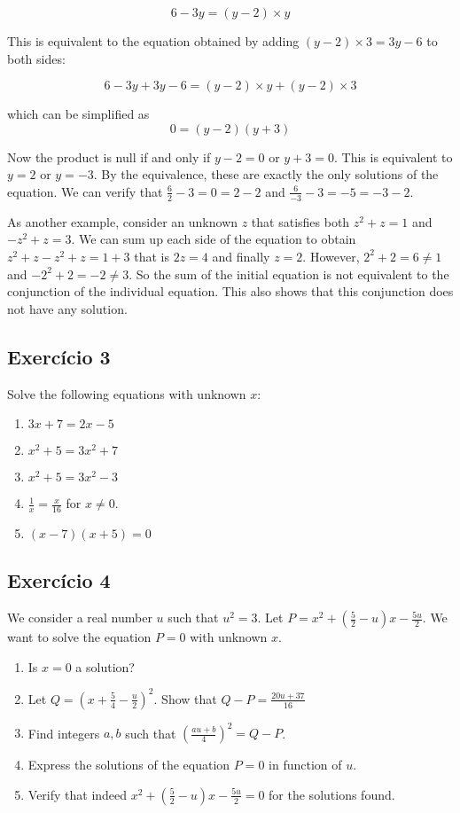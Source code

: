 $$6 - 3y = \left(y - 2\right) \times y$$

This is equivalent to the equation obtained by adding
$\left(y - 2\right) \times 3 = 3y - 6$ to both sides:

$$6 - 3y + 3y - 6 = \left(y - 2\right) \times y + 
\left(y - 2\right) \times 3$$

which can be simplified as
$$0 = \left(y - 2\right)\left(y + 3\right)$$

Now the product is null if and only if $y - 2 = 0$ or $y + 3 = 0$. This is
equivalent to $y = 2$ or $y = -3$. By the equivalence, these are
exactly the only solutions of the equation. We can verify that
$\frac{6}{2} - 3 = 0 = 2 - 2$ and $\frac{6}{-3} - 3 = -5 = -3 - 2$.

As another example, consider an unknown $z$ that satisfies both
$z^2 + z = 1$ and $-z^2 + z = 3$. We can sum up each side of the equation to
obtain $z^2 + z - z^2 + z = 1 + 3$ that is $2z = 4$ and finally $z = 2$.
However, $2^2 + 2 = 6 \neq 1$ and $-2^2 + 2 = -2 \neq 3$. So the sum of the
initial equation is not equivalent to the conjunction of the individual
equation. This also shows that this conjunction does not have any solution.

\subsection*{Exercício 3}

Solve the following equations with unknown $x$:

\begin{enumerate}
\item $3x + 7 = 2x - 5$
\item $x^2 + 5 = 3x^2 + 7$
\item $x^2 + 5 = 3x^2 - 3$
\item $\frac{1}{x} = \frac{x}{16}$ for $x \neq 0$.
\item $\left(x - 7\right)\left(x + 5\right) = 0$
\end{enumerate}

\subsection*{Exercício 4}

We consider a real number $u$ such that $u^2=3$. Let
$P = x^2 + \left(\frac{5}{2} - u\right)x - \frac{5u}{2}$. We want to solve the
equation $P = 0$ with unknown $x$.

\begin{enumerate}
\item Is $x=0$ a solution?
\item Let $Q = \left(x + \frac{5}{4} - \frac{u}{2}\right)^2$. Show that
  $Q - P = \frac{20u+37}{16}$
\item Find integers $a,b$ such that
  $\left(\frac{au+b}{4}\right)^2 = Q - P$.
\item Express the solutions of the equation $P=0$ in function of $u$.
\item Verify that indeed
  $x^2 + \left(\frac{5}{2} - u\right)x - \frac{5u}{2} = 0$ for the
  solutions found.
\end{enumerate}


